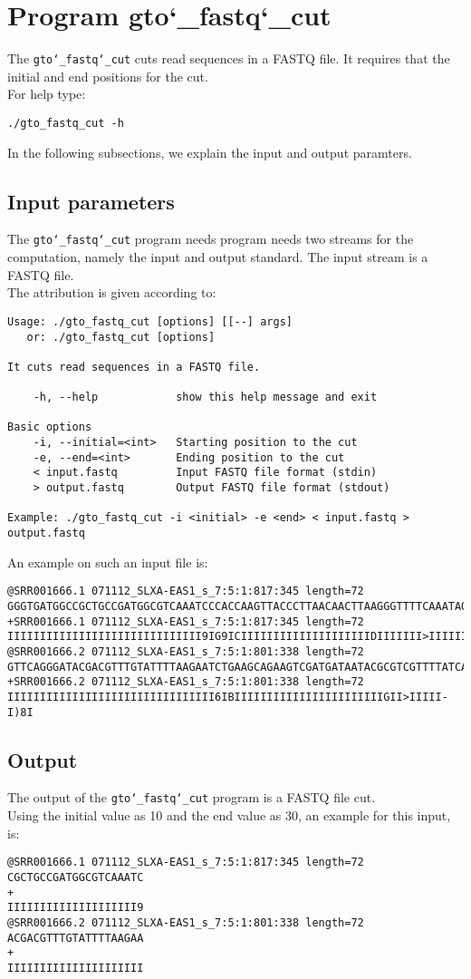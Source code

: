 \section{Program gto\char`_fastq\char`_cut}
The \texttt{gto\char`_fastq\char`_cut} cuts read sequences in a FASTQ file. It requires that the initial and end positions for the cut.\\
For help type:
\begin{lstlisting}
./gto_fastq_cut -h
\end{lstlisting}
In the following subsections, we explain the input and output paramters.

\subsection*{Input parameters}

The \texttt{gto\char`_fastq\char`_cut} program needs program needs two streams for the computation, namely the input and output standard. The input stream is a FASTQ file.\\
The attribution is given according to:
\begin{lstlisting}
Usage: ./gto_fastq_cut [options] [[--] args]
   or: ./gto_fastq_cut [options]

It cuts read sequences in a FASTQ file.

    -h, --help            show this help message and exit

Basic options
    -i, --initial=<int>   Starting position to the cut
    -e, --end=<int>       Ending position to the cut
    < input.fastq         Input FASTQ file format (stdin)
    > output.fastq        Output FASTQ file format (stdout)

Example: ./gto_fastq_cut -i <initial> -e <end> < input.fastq > output.fastq
\end{lstlisting}
An example on such an input file is:
\begin{lstlisting}
@SRR001666.1 071112_SLXA-EAS1_s_7:5:1:817:345 length=72
GGGTGATGGCCGCTGCCGATGGCGTCAAATCCCACCAAGTTACCCTTAACAACTTAAGGGTTTTCAAATAGA
+SRR001666.1 071112_SLXA-EAS1_s_7:5:1:817:345 length=72
IIIIIIIIIIIIIIIIIIIIIIIIIIIIII9IG9ICIIIIIIIIIIIIIIIIIIIIDIIIIIII>IIIIII/
@SRR001666.2 071112_SLXA-EAS1_s_7:5:1:801:338 length=72
GTTCAGGGATACGACGTTTGTATTTTAAGAATCTGAAGCAGAAGTCGATGATAATACGCGTCGTTTTATCAT
+SRR001666.2 071112_SLXA-EAS1_s_7:5:1:801:338 length=72
IIIIIIIIIIIIIIIIIIIIIIIIIIIIIIII6IBIIIIIIIIIIIIIIIIIIIIIIIGII>IIIII-I)8I
\end{lstlisting}

\subsection*{Output}
The output of the \texttt{gto\char`_fastq\char`_cut} program is a FASTQ file cut.\\
Using the initial value as 10 and the end value as 30, an example for this input, is:
\begin{lstlisting}
@SRR001666.1 071112_SLXA-EAS1_s_7:5:1:817:345 length=72
CGCTGCCGATGGCGTCAAATC
+
IIIIIIIIIIIIIIIIIIII9
@SRR001666.2 071112_SLXA-EAS1_s_7:5:1:801:338 length=72
ACGACGTTTGTATTTTAAGAA
+
IIIIIIIIIIIIIIIIIIIII
\end{lstlisting}
